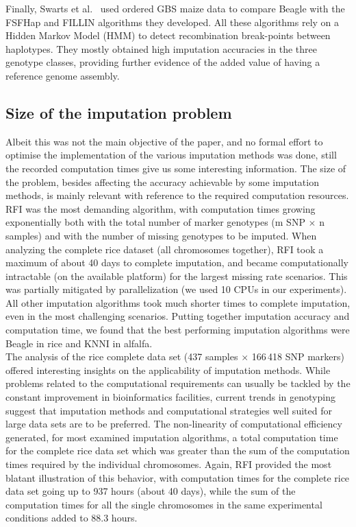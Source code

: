 Finally, Swarts et al.~\cite{swarts_novel_2014} used ordered GBS maize data to compare Beagle with the FSFHap and FILLIN algorithms they developed. All these algorithms rely on a Hidden Markov Model (HMM) to detect recombination break-points between haplotypes. They mostly obtained high imputation accuracies in the three genotype classes, providing further evidence of the added value of having a reference genome assembly.

\subsection{Size of the imputation problem}
\label{sec:size_of_problem}
Albeit this was not the main objective of the paper, and no formal effort to optimise the implementation of the various imputation methods was done, still the recorded computation times give us some interesting information.
The size of the problem, besides affecting the accuracy achievable by some imputation methods, is mainly relevant with reference to the required computation resources. RFI was the most demanding algorithm, with computation times growing exponentially both with the total number of marker genotypes (m SNP $\times$ n samples) and with the number of missing genotypes to be imputed. When analyzing the complete rice dataset (all chromosomes together), RFI took a maximum of about 40 days to complete imputation, and became computationally intractable (on the available platform) for the largest missing rate scenarios. This was partially mitigated by parallelization (we used 10 CPUs in our experiments). All other imputation algorithms took much shorter times to complete imputation, even in the most challenging scenarios. Putting together imputation accuracy and computation time, we found that the best performing imputation algorithms were Beagle in rice and KNNI in alfalfa.\\

The analysis of the rice complete data set (437 samples $\times$ 166\,418 SNP markers) offered interesting insights on the applicability of imputation methods. While problems related to the computational requirements can usually be tackled by the constant improvement in bioinformatics facilities, current trends in genotyping suggest that imputation methods and computational strategies well suited for large data sets are to be preferred. The non-linearity of computational efficiency generated, for most examined imputation algorithms, a total computation time for the complete rice data set which was greater than the sum of the computation times required by the individual chromosomes. Again, RFI provided the most blatant illustration of this behavior, with computation times for the complete rice data set going up to 937 hours (about 40 days), while the sum of the computation times for all the single chromosomes in the same experimental conditions added to 88.3 hours.
